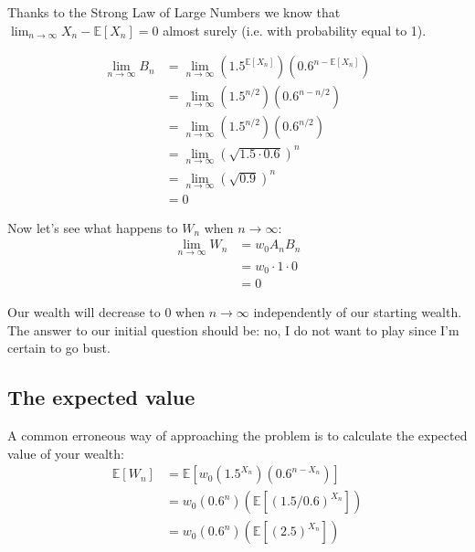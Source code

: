 \documentclass[12pt]{article}
\begin{document}
Thanks to the Strong Law of Large Numbers we know that $\lim_{n\to\infty}{X_n - \mathbb{E}[X_n]} = 0$ almost surely (i.e. with probability equal to 1).

\begin{equation*}
  \begin{split}
    \lim_{n\to\infty} B_n &=  \lim_{n\to\infty} \left(1.5^{\mathbb{E}[X_n]}\right) \left(0.6^{n - \mathbb{E}[X_n]}\right)\\
    &= \lim_{n\to\infty} \left(1.5^{n/2}\right) \left(0.6^{n - n/2}\right)\\
    &= \lim_{n\to\infty} \left(1.5^{n/2}\right) \left(0.6^{n/2}\right)\\
    &= \lim_{n\to\infty} \left(\sqrt{1.5 \cdot 0.6}\right)^{n}\\
    &= \lim_{n\to\infty} \left(\sqrt{0.9}\right) ^{n}\\
    &= 0
  \end{split}
\end{equation*}

Now let's see what happens to $W_n$ when $n \rightarrow \infty$:
\begin{equation*}
  \begin{split}
    \lim_{n\to\infty} W_n &= w_0 A_n  B_n\\
    & = w_0 \cdot 1 \cdot 0 \\
    & = 0
  \end{split}
\end{equation*}
  
Our wealth will decrease to 0 when $n\to\infty$ independently of our starting wealth. The answer to our initial question should be: no, I do not want to play since I'm certain to go bust.

\subsection{The expected value}
A common erroneous way of approaching the problem is to calculate the expected value of your wealth:
\begin{equation*}
  \begin{split}
    \mathbb{E}[W_n] &= \mathbb{E}[w_0 \left(1.5^{X_n}\right) \left(0.6^{n-X_n}\right)]\\
    & = w_0  \left(0.6^n\right) \left(\mathbb{E}[(1.5/0.6)^{X_n}]\right)\\
    & = w_0 \left(0.6^n\right) \left(\mathbb{E}[(2.5)^{X_n}]\right)
  \end{split}
\end{equation*}
\end{document}
